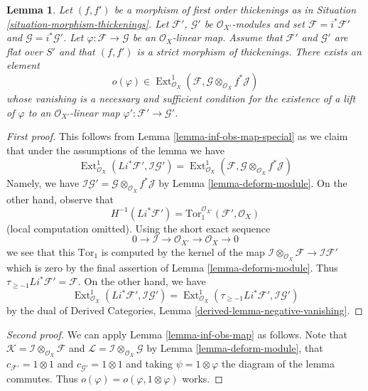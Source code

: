 \documentclass{stacks-project}
\theoremstyle{plain}
\newtheorem{lemma}[subsection]{Lemma}
\theoremstyle{definition}
\theoremstyle{remark}
\numberwithin{equation}{subsection}
\def\Ext{\mathop{\mathrm{Ext}}\nolimits}
\begin{document}
\begin{lemma}
\label{lemma-inf-obs-map-rel}
Let $(f, f')$ be a morphism of first
order thickenings as in Situation \ref{situation-morphism-thickenings}.
Let $\mathcal{F}'$, $\mathcal{G}'$ be $\mathcal{O}_{X'}$-modules and set
$\mathcal{F} = i^*\mathcal{F}'$ and $\mathcal{G} = i^*\mathcal{G}'$.
Let $\varphi : \mathcal{F} \to \mathcal{G}$ be an $\mathcal{O}_X$-linear map.
Assume that $\mathcal{F}'$ and $\mathcal{G}'$ are flat over $S'$ and
that $(f, f')$ is a strict morphism of thickenings. There exists an element
$$
o(\varphi) \in  \Ext^1_{\mathcal{O}_X}(\mathcal{F},
\mathcal{G} \otimes_{\mathcal{O}_X} f^*\mathcal{J})
$$
whose vanishing is a necessary and sufficient condition for the
existence of a lift of $\varphi$ to an $\mathcal{O}_{X'}$-linear map
$\varphi' : \mathcal{F}' \to \mathcal{G}'$.
\end{lemma}

\begin{proof}[First proof]
This follows from Lemma \ref{lemma-inf-obs-map-special}
as we claim that under the assumptions of the lemma we have
$$
\Ext^1_{\mathcal{O}_X}(Li^*\mathcal{F}',
\mathcal{I}\mathcal{G}') =
\Ext^1_{\mathcal{O}_X}(\mathcal{F},
\mathcal{G} \otimes_{\mathcal{O}_X} f^*\mathcal{J})
$$
Namely, we have
$\mathcal{I}\mathcal{G}' =
\mathcal{G} \otimes_{\mathcal{O}_X} f^*\mathcal{J}$
by Lemma \ref{lemma-deform-module}.
On the other hand, observe that
$$
H^{-1}(Li^*\mathcal{F}') =
\text{Tor}_1^{\mathcal{O}_{X'}}(\mathcal{F}', \mathcal{O}_X)
$$
(local computation omitted). Using the short exact sequence
$$
0 \to \mathcal{I} \to \mathcal{O}_{X'} \to \mathcal{O}_X \to 0
$$
we see that this $\text{Tor}_1$ is computed by the kernel of the map
$\mathcal{I} \otimes_{\mathcal{O}_X} \mathcal{F} \to \mathcal{I}\mathcal{F}'$
which is zero by the final assertion of Lemma \ref{lemma-deform-module}.
Thus $\tau_{\geq -1}Li^*\mathcal{F}' = \mathcal{F}$.
On the other hand, we have
$$
\Ext^1_{\mathcal{O}_X}(Li^*\mathcal{F}',
\mathcal{I}\mathcal{G}') =
\Ext^1_{\mathcal{O}_X}(\tau_{\geq -1}Li^*\mathcal{F}',
\mathcal{I}\mathcal{G}')
$$
by the dual of
Derived Categories, Lemma \ref{derived-lemma-negative-vanishing}.
\end{proof}

\begin{proof}[Second proof]
We can apply Lemma \ref{lemma-inf-obs-map} as follows. Note that
$\mathcal{K} = \mathcal{I} \otimes_{\mathcal{O}_X} \mathcal{F}$ and
$\mathcal{L} = \mathcal{I} \otimes_{\mathcal{O}_X} \mathcal{G}$
by Lemma \ref{lemma-deform-module}, that
$c_{\mathcal{F}'} = 1 \otimes 1$ and $c_{\mathcal{G}'} = 1 \otimes 1$
and taking $\psi = 1 \otimes \varphi$ the diagram of the lemma
commutes. Thus $o(\varphi) = o(\varphi, 1 \otimes \varphi)$
works.
\end{proof}
\end{document}

